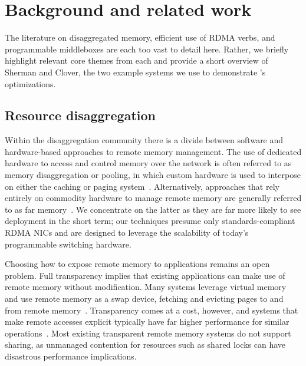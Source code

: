 \section{Background and related work}

The literature on disaggregated memory, efficient use of RDMA verbs,
and programmable middleboxes are each too vast to detail here.
Rather, we briefly highlight relevant core themes from each and 
provide a short overview of Sherman and Clover, the two example
systems we use to demonstrate \sword's optimizations.

\subsection{Resource disaggregation}

Within the disaggregation community there is a divide between software
and hardware-based approaches to remote memory management.  The use of
dedicated hardware to access and control memory over the network is
often referred to as memory disaggregation or pooling, in which custom hardware
is used to interpose on either the caching or paging
system~\cite{dredbox,rethinking}.  Alternatively, approaches that rely
entirely on commodity hardware to manage remote memory are generally
referred to as far memory~\cite{reigons,fastswap, legoos,
  clover, lite}.  We concentrate on the latter as they are far more
likely to see deployment in the short term; our techniques presume
only standards-compliant RDMA NICs and are designed to leverage the
scalability of today's programmable switching hardware.

Choosing how to expose remote memory to applications remains an open
problem. Full transparency implies that existing applications can make
use of remote memory without modification. Many systems leverage
virtual memory and use remote memory as a swap device, fetching and
evicting pages to and from remote
memory~\cite{fastswap,GMS,infiniswap,leap,ramcloud}. Transparency
comes at a cost, however, and systems that make remote accesses
explicit typically have far higher performance for similar
operations~\cite{aifm}.  Most existing transparent remote memory
systems do not support sharing, as unmanaged contention for resources
such as shared locks can have disastrous performance implications.



